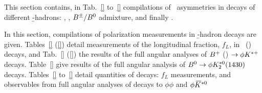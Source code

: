 %
%
%

%


\label{sec:rare-acp}

This section contains, in Tab.~\ref{} to~\ref{} compilations of \CP\ asymmetries in decays of different \b-hadrons: \Bp, \Bz, $B^\pm/B^0$ admixture, \Bs and finally \Lb.

%

\label{sec:rare-polar}

In this section, compilations of polarization measurements in \b-hadron decays are given. Tables~\ref{} (\ref{}) detail measurements of the longitudinal fraction, $f_L$, in \Bp\ (\Bz) decays, and Tab.~\ref{} (\ref{}) the results of the full angular analyses of $B^{+}$ (\Bz) $\to\phi K^{*+}$ decays. Table~\ref{} give results of the full angular analysis of $B^0\to\phi K_2^{\ast 0}(1430)$ decays. Tables~\ref{} to~\ref{} detail quantities of \Bs decays: $f_L$ measurements, and observables from full angular analyses of decays to $\phi\phi$ and $\phi\kern 0.2em\overline{\kern -0.2em K}{}^{*0}$

%
